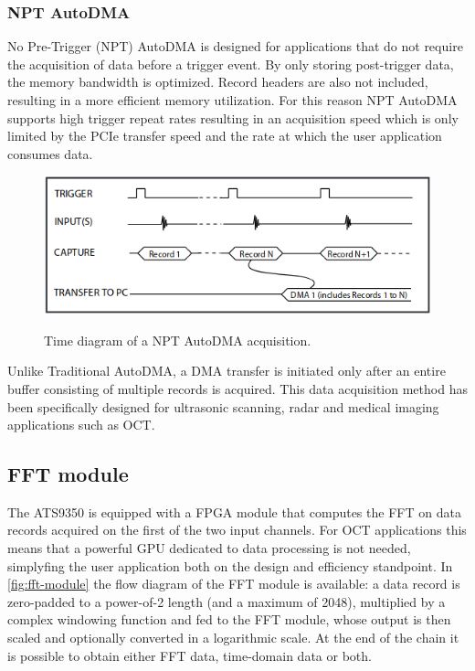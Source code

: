 	\subsubsection{NPT AutoDMA}
	No Pre-Trigger (NPT) AutoDMA is designed for applications that do not require the acquisition of data before a trigger event. By only storing post-trigger data, the memory bandwidth is optimized. Record headers are also not included, resulting in a more efficient memory utilization. For this reason NPT AutoDMA supports high trigger repeat rates resulting in an acquisition speed which is only limited by the PCIe transfer speed and the rate at which the user application consumes data. 
	
	\begin{figure}[bth]
		\myfloatalign
		{\includegraphics[width=.75\linewidth]{gfx/ch3/npt-autodma}}
		\caption{Time diagram of a NPT AutoDMA acquisition.}\label{fig:npt-autodma}
	\end{figure}

	Unlike Traditional AutoDMA, a DMA transfer is initiated only after an entire buffer consisting of multiple records is acquired. This data acquisition method has been specifically designed for ultrasonic scanning, radar and medical imaging applications such as OCT. 
    
    \subsection{FFT module}
    The ATS9350 is equipped with a \ac{FPGA} module that computes the FFT on data records acquired on the first of the two input channels. For OCT applications this means that a powerful GPU dedicated to data processing is not needed, simplyfing the user application both on the design and efficiency standpoint. In \autoref{fig:fft-module} the flow diagram of the FFT module is available: a data record is zero-padded to a power-of-2 length (and a maximum of 2048), multiplied by a complex windowing function and fed to the FFT module, whose output is then scaled and optionally converted in a logarithmic scale. At the end of the chain it is possible to obtain either FFT data, time-domain data or both. 
    
